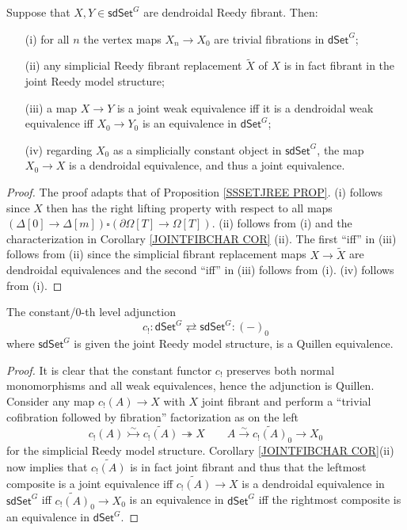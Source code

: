 \documentclass[a4paper,10pt
,draft
]{article}%
\begin{document}
\begin{corollary}\label{SDSETG COR}
	Suppose that $X, Y \in \mathsf{sdSet}^G$ are dendroidal Reedy fibrant. Then:
\begin{itemize}
	\item[(i)] for all $n$ the vertex maps $X_{n} \to X_{0}$ are trivial fibrations in $\mathsf{dSet}^G$;
	\item[(ii)] any simplicial Reedy fibrant replacement $\tilde{X}$ of $X$ is in fact fibrant in the joint Reedy model structure;
	\item[(iii)] a map $X \to Y$ is a joint weak equivalence
	iff it is a dendroidal weak equivalence iff 
	$X_0 \to Y_0$ is an equivalence in $\mathsf{dSet}^G$;
	\item[(iv)] regarding $X_0$ as a simplicially constant object in $\mathsf{sdSet}^G$, the map $X_0 \to X$ is a dendroidal equivalence, and thus a joint equivalence. 
\end{itemize}
\end{corollary}

\begin{proof}
	The proof adapts that of Proposition \ref{SSSETJREE PROP}.
	(i) follows since $X$ then has the right lifting property with respect to all maps 
	$(\Delta[0] \to \Delta[m]) \square (\partial \Omega[T] \to \Omega[T])$. (ii) follows from (i) and the characterization in  Corollary \ref{JOINTFIBCHAR COR} (ii). The first ``iff'' in (iii) follows from (ii) since the simplicial fibrant replacement maps 
	$X \to \tilde{X}$ are dendroidal equivalences
	and the second ``iff'' in (iii) follows from (i).
	(iv) follows from (i).
\end{proof}


\begin{theorem}\label{INC0AGJ THM}
	The constant/$0$-th level adjunction
	\[
	c_!\colon 
	\mathsf{dSet}^G \rightleftarrows \mathsf{sdSet}^G
	\colon (-)_0
	\]
	where $\mathsf{sdSet}^G$ is given the joint Reedy model structure,
	is a Quillen equivalence.
\end{theorem}

\begin{proof}
	It is clear that the constant functor $c_!$ preserves both normal monomorphisms and all weak equivalences, hence the adjunction is Quillen. 
	Consider any map $c_!(A) \to X$ with $X$ joint fibrant and perform a ``trivial cofibration followed by fibration'' factorization as on the left
\[
c_!(A) \overset{\sim}{\rightarrowtail} \widetilde{c_!(A)} \twoheadrightarrow X
	\qquad
A \xrightarrow{\sim} \widetilde{c_!(A)}_0 \to X_0
\]
	for the simplicial Reedy model structure. 
	Corollary \ref{JOINTFIBCHAR COR}(ii) now implies that 
	$\widetilde{c_!(A)}$ is in fact joint fibrant
	and thus that the leftmost composite is a joint equivalence iff $\widetilde{c_!(A)} \to X$ is a dendroidal equivalence in $\mathsf{sdSet}^G$ iff $\widetilde{c_!(A)}_0 \to X_0$ is an equivalence in  $\mathsf{dSet}^G$ iff the rightmost composite is an equivalence in $\mathsf{dSet}^G$.
\end{proof}
\end{document}
